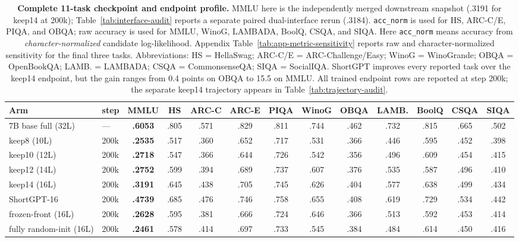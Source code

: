 \begin{table}[t]
\centering
\scriptsize
\setlength{\tabcolsep}{2.2pt}
\begin{tabular}{@{}llccccccccccc@{}}
\toprule
\textbf{Arm} & \textbf{step} & \textbf{MMLU} & \textbf{HS} &
\textbf{ARC-C} & \textbf{ARC-E} & \textbf{PIQA} & \textbf{WinoG} &
\textbf{OBQA} & \textbf{LAMB.} & \textbf{BoolQ} & \textbf{CSQA} &
\textbf{SIQA} \\
\midrule
7B base full (32L)       & ---    & \textbf{.6053} & .805 & .571 & .829 & .811 & .744 & .462 & .732 & .815 & .665 & .502 \\
keep8 (10L)              & 200k & \textbf{.2535} & .517 & .360 & .652 & .717 & .531 & .366 & .446 & .595 & .452 & .398 \\
keep10 (12L)             & 200k & \textbf{.2718} & .547 & .366 & .644 & .726 & .542 & .356 & .496 & .609 & .454 & .415 \\
keep12 (14L)             & 200k & \textbf{.2752} & .599 & .394 & .689 & .737 & .607 & .376 & .535 & .587 & .496 & .410 \\
keep14 (16L)             & 200k & \textbf{.3191} & .645 & .438 & .705 & .745 & .626 & .404 & .577 & .638 & .499 & .434 \\
ShortGPT-16              & 200k & \textbf{.4739} & .685 & .476 & .746 & .758 & .655 & .408 & .619 & .729 & .534 & .442 \\
frozen-front (16L)       & 200k & \textbf{.2628} & .595 & .381 & .666 & .724 & .646 & .366 & .513 & .592 & .453 & .414 \\
fully random-init (16L)  & 200k & \textbf{.2461} & .578 & .414 & .697 & .733 & .545 & .384 & .484 & .614 & .450 & .416 \\
\bottomrule
\end{tabular}
\caption{\textbf{Complete 11-task checkpoint and endpoint profile.}
MMLU here is the independently merged downstream snapshot (.3191 for keep14 at
200k); Table~\ref{tab:interface-audit} reports a separate paired
dual-interface rerun (.3184).
\texttt{acc\_norm} is used for HS, ARC-C/E, PIQA, and OBQA; raw accuracy is
used for MMLU, WinoG, LAMBADA, BoolQ, CSQA, and SIQA. Here
\texttt{acc\_norm} means accuracy from \emph{character-normalized} candidate
log-likelihood. Appendix Table~\ref{tab:app-metric-sensitivity} reports raw
and character-normalized sensitivity for the final three tasks. Abbreviations: HS = HellaSwag;
ARC-C/E = ARC-Challenge/Easy; WinoG = WinoGrande; OBQA = OpenBookQA; LAMB. =
LAMBADA; CSQA = CommonsenseQA; SIQA = SocialIQA. ShortGPT improves every
reported task over the keep14 endpoint, but the gain ranges from 0.4 points on
OBQA to 15.5 on MMLU. All trained endpoint rows are reported at step 200k; the separate keep14
trajectory appears in Table~\ref{tab:trajectory-audit}.}
\label{tab:downstream}
\end{table}
